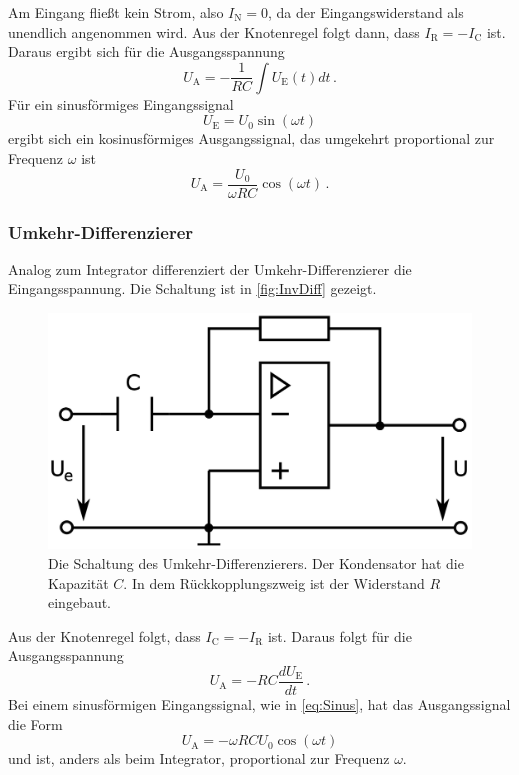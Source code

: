 Am Eingang fließt kein Strom, also $I_\text{N} = 0$, da der Eingangswiderstand als unendlich angenommen wird. Aus der Knotenregel folgt dann, dass $I_\text{R} = - I_\text{C}$ ist. Daraus ergibt sich für die Ausgangsspannung
\begin{equation*}
    U_\text{A} = - \frac{1}{R C} \int U_\text{E}(t) dt \, .
    \label{eq:Integrator}
\end{equation*}
Für ein sinusförmiges Eingangssignal
\begin{equation}
    U_\text{E} = U_0 \sin(\omega t)
    \label{eq:Sinus}
\end{equation}
ergibt sich ein kosinusförmiges Ausgangssignal, das umgekehrt proportional zur Frequenz $\omega$ ist
\begin{equation}
    U_\text{A} = \frac{U_0}{\omega R C} \cos(\omega t) \, .
    \label{eq:Int_Kosinus}
\end{equation}


\subsubsection{Umkehr-Differenzierer}
Analog zum Integrator differenziert der Umkehr-Differenzierer die Eingangsspannung. Die Schaltung ist in \autoref{fig:InvDiff} gezeigt.

\begin{figure}
    \centering
    \includegraphics[width=0.7\linewidth]{./figures/3_InvDiff.png}
    \caption{Die Schaltung des Umkehr-Differenzierers. Der Kondensator hat die Kapazität $C$. In dem Rückkopplungszweig ist der Widerstand $R$ eingebaut. \cite{V51}}
    \label{fig:InvDiff}
\end{figure}
\FloatBarrier

Aus der Knotenregel folgt, dass $I_\text{C} = - I_\text{R}$ ist. Daraus folgt für die Ausgangsspannung
\begin{equation*}
    U_\text{A} = - R C \frac{d U_\text{E}}{dt} \, .
    \label{eq:Differenzierer}
\end{equation*}
Bei einem sinusförmigen Eingangssignal, wie in \autoref{eq:Sinus}, hat das Ausgangssignal die Form 
\begin{equation}
    U_\text{A} = - \omega R C U_0 \cos(\omega t)
    \label{eq:Diff_Kosinus}
\end{equation}
und ist, anders als beim Integrator, proportional zur Frequenz $\omega$.


